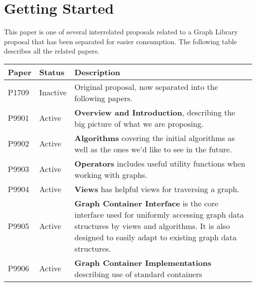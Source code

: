
\section{Getting Started}

This paper is one of several interrelated proposals related to a Graph Library proposal that has been
separated for easier consumption. The following table describes all the related papers.

\begin{table}[h!]
    \begin{center}
    {\begin{tabular}{l l p{14cm}}
       \hline
       \textbf{Paper}     & \textbf{Status} & \textbf{Description}                                                                                                                                                                             \\
       \hline
       P1709              & Inactive       & Original proposal, now separated into the following papers. \\
       \hdashline
       P9901              & Active         & \textbf{Overview and Introduction}, describing the big
                                             picture of what we are proposing. \\
       P9902              & Active         & \textbf{Algorithms} covering the initial algorithms 
                                             as well as the ones we'd like to see in the future. \\
       P9903              & Active         & \textbf{Operators} includes useful utility functions when
                                             working with graphs. \\
       P9904              & Active         & \textbf{Views} has helpful views for traversing a graph. \\
       P9905              & Active         & \textbf{Graph Container Interface} is the core interface used
                                             for uniformly accessing graph data structures by views and algorithms.
                                             It is also designed to easily adapt to existing graph data structures.\\
       P9906              & Active         & \textbf{Graph Container Implementations} describing use of standard containers

\end{tabular}}
\end{center}
\end{table}
